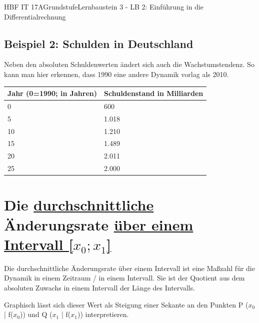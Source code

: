\documentclass[11pt,twocolumn,oneside,openany,headings=optiontotoc,11pt,numbers=noenddot]{article}
\begin{document}
\begin{worksheet}{HBF IT 17A}{Grundstufe}{Lernbaustein 3 - LB 2: Einführung in die Differentialrechnung}
		\subsection*{Beispiel 2: Schulden in Deutschland}
		Neben den absoluten Schuldenwerten ändert sich auch die Wachstumstendenz. So kann man hier erkennen, dass 1990 eine andere Dynamik vorlag als 2010.
		\begin{table}[htb]
			\begin{tabularx}{0.5\textwidth}{|X|X|}
				\hline
				Jahr (0=1990; in Jahren) & Schuldenstand in Milliarden\\
				\hline
				0 & 600\\
				\hline
				5 & 1.018\\
				\hline
				10 & 1.210\\
				\hline
				15 & 1.489\\
				\hline
				20 & 2.011\\
				\hline
				25 & 2.000\\
				\hline
			\end{tabularx}
		\end{table}
		\section{Die \underline{durchschnittliche} Änderungsrate \underline{über einem Intervall [\(x_{0};x_{1}\)]}}
		Die durchschnittliche Änderungsrate über einem Intervall ist eine Maßzahl für die Dynamik in einem Zeitraum / in einem Intervall. Sie ist der Quotient aus dem absoluten Zuwachs in einem Intervall der Länge des Intervalls.\\
		\par\noindent
		Graphisch lässt sich dieser Wert als Steigung einer Sekante an den Punkten P (\(x_{0}\) | f(\(x_{0}\))) und Q (\(x_{1}\) | f(\(x_{1}\))) interpretieren.

\end{worksheet}
\end{document}
